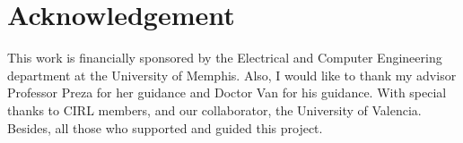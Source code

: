 \documentclass[conference, 11pt]{IEEEtran}
\begin{document}
	\section{Acknowledgement}
	This work is financially sponsored by the Electrical and Computer Engineering department at the University of Memphis. Also, I would like to thank my advisor Professor Preza for her guidance and Doctor Van for his guidance. With special thanks to CIRL members, and our collaborator, the University of Valencia. Besides, all those who supported and guided this project.
	
	 
	
	
	\vspace{12pt}
	\color{red}	
	
\end{document}
